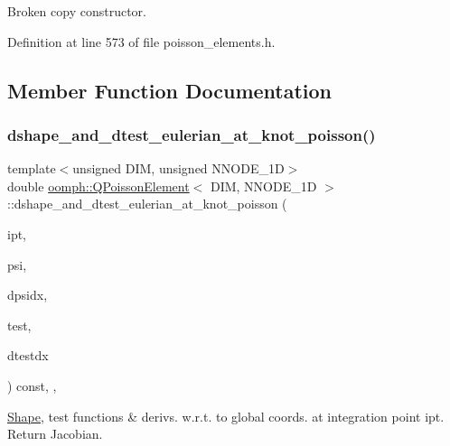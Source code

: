 Broken copy constructor. 



Definition at line 573 of file poisson\+\_\+elements.\+h.



\subsection{Member Function Documentation}
\mbox{\label{classoomph_1_1QPoissonElement_a0f51d1468383a7af95b82522038d4e20}} 
\subsubsection{\texorpdfstring{dshape\+\_\+and\+\_\+dtest\+\_\+eulerian\+\_\+at\+\_\+knot\+\_\+poisson()}{dshape\_and\_dtest\_eulerian\_at\_knot\_poisson()}\hspace{0.1cm}{\footnotesize\ttfamily [1/2]}}
{\footnotesize\ttfamily template$<$unsigned D\+IM, unsigned N\+N\+O\+D\+E\+\_\+1D$>$ \\
double \hyperlink{classoomph_1_1QPoissonElement}{oomph\+::\+Q\+Poisson\+Element}$<$ D\+IM, N\+N\+O\+D\+E\+\_\+1D $>$\+::dshape\+\_\+and\+\_\+dtest\+\_\+eulerian\+\_\+at\+\_\+knot\+\_\+poisson (\begin{DoxyParamCaption}\item[{const unsigned \&}]{ipt,  }\item[{\hyperlink{classoomph_1_1Shape}{Shape} \&}]{psi,  }\item[{\hyperlink{classoomph_1_1DShape}{D\+Shape} \&}]{dpsidx,  }\item[{\hyperlink{classoomph_1_1Shape}{Shape} \&}]{test,  }\item[{\hyperlink{classoomph_1_1DShape}{D\+Shape} \&}]{dtestdx }\end{DoxyParamCaption}) const\hspace{0.3cm}{\ttfamily [inline]}, {\ttfamily [protected]}, {\ttfamily [virtual]}}



\hyperlink{classoomph_1_1Shape}{Shape}, test functions \& derivs. w.\+r.\+t. to global coords. at integration point ipt. Return Jacobian. 

